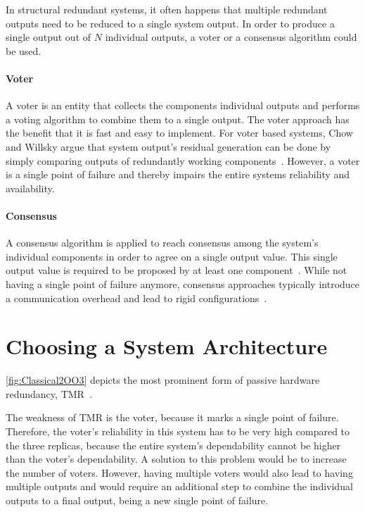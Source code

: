 
In structural redundant systems, it often happens that multiple redundant outputs need to be reduced to a single system output.
In order to produce a single output out of $N$ individual outputs, a voter or a consensus algorithm could be used.

\paragraph{Voter} 
A voter is an entity that collects the components individual outputs and performs a voting algorithm to combine them to a single output.
The voter approach has the benefit that it is fast and easy to implement.
For voter based systems, Chow and Willsky argue that system output's residual generation can be done by simply comparing outputs of redundantly working components~\cite{ChowFailureDetectionSystems}.
However, a voter is a single point of failure and thereby impairs the entire systems reliability and availability.

\paragraph{Consensus} 
A consensus algorithm is applied to reach consensus among the system's individual components in order to agree on a single output value.
This single output value is required to be proposed by at least one component~\cite{lamport2001paxos}.
While not having a single point of failure anymore, consensus approaches typically introduce a communication overhead and lead to rigid configurations~\cite{GamerIncreasingMOON}.


\section{Choosing a System Architecture}







\autoref{fig:Classical2OO3} depicts the most prominent form of passive hardware redundancy, \gls*{TMR}~\cite{BarryFaultToleranceAnalysis}.


The weakness of \gls*{TMR} is the voter, because it marks a single point of failure.
Therefore, the voter's reliability in this system has to be very high compared to the three replicas, because the entire system's dependability cannot be higher than the voter's dependability.
A solution to this problem would be to increase the number of voters.
However, having multiple voters would also lead to having multiple outputs and would require an additional step to combine the individual outputs to a final output, being a new single point of failure.

